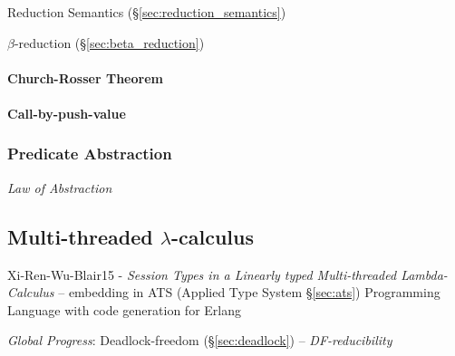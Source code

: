 Reduction Semantics (\S\ref{sec:reduction_semantics})

$\beta$-reduction (\S\ref{sec:beta_reduction})



\paragraph{Church-Rosser Theorem}\label{sec:church_rosser}\hfill

\paragraph{Call-by-push-value}\label{sec:call_by_pushvalue}\hfill



\subsubsection{Predicate Abstraction}\label{sec:predicate_abstraction}

\emph{Law of Abstraction}



\subsection{Multi-threaded $\lambda$-calculus}\label{sec:mtlc}

\begingroup

\newcommand{\chpos}{\mathbf{chpos}}
\newcommand{\chneg}{\mathbf{chneg}}
\newcommand{\channelsend}{\mono{channel\_send}}
\newcommand{\chanpossend}{\mono{chanpos\_send}}
\newcommand{\channegsend}{\mono{channeg\_send}}
\newcommand{\channelrecv}{\mono{channel\_recv}}
\newcommand{\chanposrecv}{\mono{chanpos\_recv}}
\newcommand{\channegrecv}{\mono{channeg\_recv}}
\newcommand{\channelclose}{\mono{channel\_close}}
\newcommand{\chanposclose}{\mono{chanpos\_close}}
\newcommand{\channegclose}{\mono{channeg\_close}}
\newcommand{\Send}{\mathsf{Send}}
\newcommand{\Recv}{\mathsf{Recv}}
\renewcommand{\Unit}{\mathsf{\mathbf{1}}}

Xi-Ren-Wu-Blair15 - \emph{Session Types in a Linearly typed
  Multi-threaded Lambda-Calculus} -- embedding in ATS (Applied Type
System \S\ref{sec:ats}) Programming Language with code generation for
Erlang

\emph{Global Progress}: Deadlock-freedom (\S\ref{sec:deadlock}) --
\emph{DF-reducibility}

